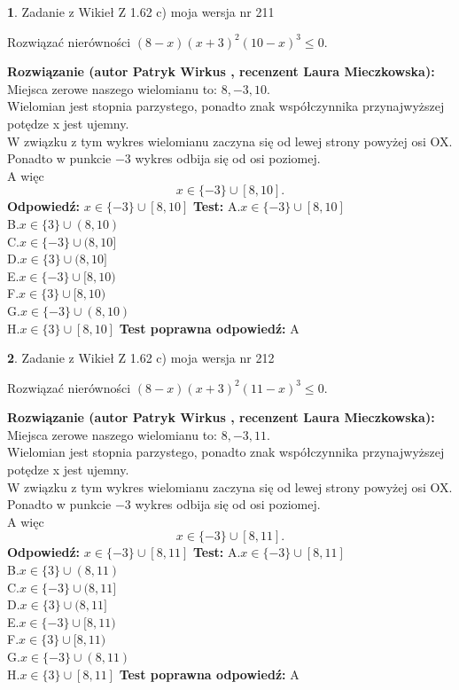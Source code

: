 \documentclass[12pt, a4paper]{article}
\theoremstyle{definition} %
\newtheorem{zad}{}
\newcommand{\zadStart}[1]{\begin{zad}#1\newline}
\newcommand{\zadStop}{\end{zad}}
\newcommand{\rozwStart}[2]{\noindent \textbf{Rozwiązanie (autor #1 , recenzent #2): }\newline}
\newcommand{\rozwStop}{\newline}
\newcommand{\odpStart}{\noindent \textbf{Odpowiedź:}\newline}
\newcommand{\odpStop}{\newline}
\newcommand{\testStart}{\noindent \textbf{Test:}\newline}
\newcommand{\testStop}{\newline}
\newcommand{\kluczStart}{\noindent \textbf{Test poprawna odpowiedź:}\newline}
\newcommand{\kluczStop}{\newline}
\begin{document}
\zadStart{Zadanie z Wikieł Z 1.62 c) moja wersja nr 211}

Rozwiązać nierówności $(8-x)(x+3)^{2}(10-x)^{3}\le0$.
\zadStop
\rozwStart{Patryk Wirkus}{Laura Mieczkowska}
Miejsca zerowe naszego wielomianu to: $8, -3, 10$.\\
Wielomian jest stopnia parzystego, ponadto znak współczynnika przy\linebreak najwyższej potędze x jest ujemny.\\ W związku z tym wykres wielomianu zaczyna się od lewej strony powyżej osi OX.\\
Ponadto w punkcie $-3$ wykres odbija się od osi poziomej.\\
A więc $$x \in \{-3\} \cup [8,10].$$
\rozwStop
\odpStart
$x \in \{-3\} \cup [8,10]$
\odpStop
\testStart
A.$x \in \{-3\} \cup [8,10]$\\
B.$x \in \{3\} \cup (8,10)$\\
C.$x \in \{-3\} \cup (8,10]$\\
D.$x \in \{3\} \cup (8,10]$\\
E.$x \in \{-3\} \cup [8,10)$\\
F.$x \in \{3\} \cup [8,10)$\\
G.$x \in \{-3\} \cup (8,10)$\\
H.$x \in \{3\} \cup [8,10]$
\testStop
\kluczStart
A
\kluczStop



\zadStart{Zadanie z Wikieł Z 1.62 c) moja wersja nr 212}

Rozwiązać nierówności $(8-x)(x+3)^{2}(11-x)^{3}\le0$.
\zadStop
\rozwStart{Patryk Wirkus}{Laura Mieczkowska}
Miejsca zerowe naszego wielomianu to: $8, -3, 11$.\\
Wielomian jest stopnia parzystego, ponadto znak współczynnika przy\linebreak najwyższej potędze x jest ujemny.\\ W związku z tym wykres wielomianu zaczyna się od lewej strony powyżej osi OX.\\
Ponadto w punkcie $-3$ wykres odbija się od osi poziomej.\\
A więc $$x \in \{-3\} \cup [8,11].$$
\rozwStop
\odpStart
$x \in \{-3\} \cup [8,11]$
\odpStop
\testStart
A.$x \in \{-3\} \cup [8,11]$\\
B.$x \in \{3\} \cup (8,11)$\\
C.$x \in \{-3\} \cup (8,11]$\\
D.$x \in \{3\} \cup (8,11]$\\
E.$x \in \{-3\} \cup [8,11)$\\
F.$x \in \{3\} \cup [8,11)$\\
G.$x \in \{-3\} \cup (8,11)$\\
H.$x \in \{3\} \cup [8,11]$
\testStop
\kluczStart
A
\kluczStop
\end{document}
